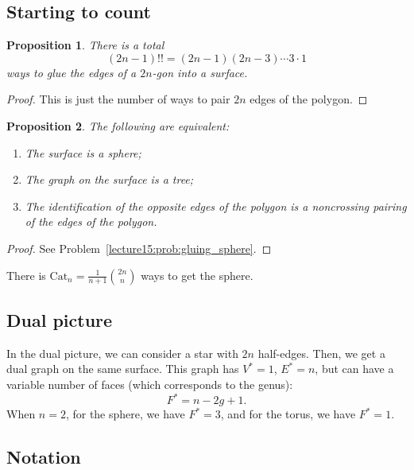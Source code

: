 \documentclass[letterpaper,11pt,oneside,reqno]{book}
\numberwithin{equation}{chapter}  %
\newtheorem{proposition}{Proposition}[chapter]  %
\theoremstyle{definition}
\begin{document}
\subsection{Starting to count}

\begin{proposition}
	There is a total
	\begin{equation*}
		(2n-1)!!=(2n-1)(2n-3)\cdots 3\cdot 1
	\end{equation*}
	ways to glue the edges of a $2n$-gon into a surface.
\end{proposition}
\begin{proof}
	This is just the number of ways to pair $2n$ edges of the polygon.
\end{proof}

\begin{proposition}
	\label{lecture15:prop:gluing_sphere}
	The following are equivalent:
	\begin{enumerate}
		\item The surface is a sphere;
		\item The graph on the surface is a tree;
		\item The identification of the opposite edges of the polygon is a \emph{noncrossing pairing} of the edges of the polygon.
	\end{enumerate}
\end{proposition}
\begin{proof}
	See Problem~\ref{lecture15:prob:gluing_sphere}.
\end{proof}
There is $\mathrm{Cat}_n=\frac{1}{n+1}\binom{2n}{n}$ ways to get the sphere.


\subsection{Dual picture}

In the dual picture, we can consider a star with $2n$ half-edges. Then, we get a dual graph on the
same surface. This graph has $V^*=1$, $E^*=n$, but can have a variable number of faces (which corresponds to the genus):
\begin{equation*}
	F^*=n-2g+1.
\end{equation*}
When $n=2$, for the sphere, we have $F^*=3$, and for the torus, we have $F^*=1$.


\subsection{Notation}
\end{document}
